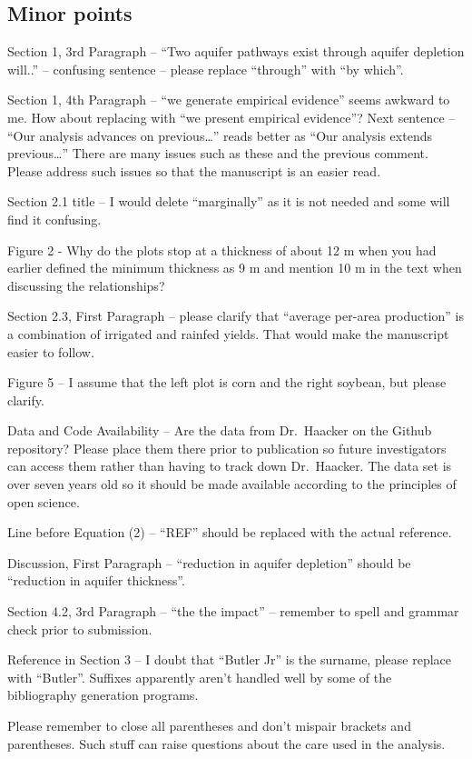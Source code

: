 \documentclass[
]{article}
\begin{document}
\hypertarget{minor-points}{%
\subsection{Minor points}\label{minor-points}}

Section 1, 3rd Paragraph -- ``Two aquifer pathways exist through aquifer
depletion will..'' -- confusing sentence -- please replace ``through''
with ``by which''.

Section 1, 4th Paragraph -- ``we generate empirical evidence'' seems
awkward to me. How about replacing with ``we present empirical
evidence''? Next sentence -- ``Our analysis advances on
previous\ldots{}'' reads better as ``Our analysis extends
previous\ldots{}'' There are many issues such as these and the previous
comment. Please address such issues so that the manuscript is an easier
read.

Section 2.1 title -- I would delete ``marginally'' as it is not needed
and some will find it confusing.

Figure 2 - Why do the plots stop at a thickness of about 12 m when you
had earlier defined the minimum thickness as 9 m and mention 10 m in the
text when discussing the relationships?

Section 2.3, First Paragraph -- please clarify that ``average per-area
production'' is a combination of irrigated and rainfed yields. That
would make the manuscript easier to follow.

Figure 5 -- I assume that the left plot is corn and the right soybean,
but please clarify.

Data and Code Availability -- Are the data from Dr.~Haacker on the
Github repository? Please place them there prior to publication so
future investigators can access them rather than having to track down
Dr.~Haacker. The data set is over seven years old so it should be made
available according to the principles of open science.

Line before Equation (2) -- ``REF'' should be replaced with the actual
reference.

Discussion, First Paragraph -- ``reduction in aquifer depletion'' should
be ``reduction in aquifer thickness''.

Section 4.2, 3rd Paragraph -- ``the the impact'' -- remember to spell
and grammar check prior to submission.

Reference in Section 3 -- I doubt that ``Butler Jr'' is the surname,
please replace with ``Butler''. Suffixes apparently aren't handled well
by some of the bibliography generation programs.

Please remember to close all parentheses and don't mispair brackets and
parentheses. Such stuff can raise questions about the care used in the
analysis.
\end{document}
